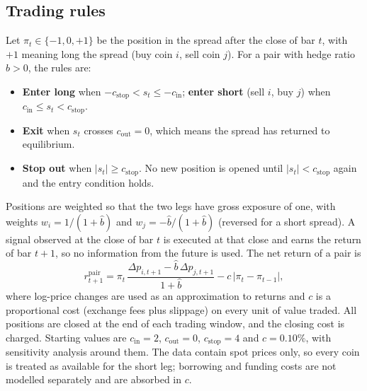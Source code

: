 \documentclass[10pt,a4paper,twocolumn]{article}
\begin{document}
	\subsection{Trading rules}
	\label{sec:rules}
	Let $\pi_t\in\{-1,0,+1\}$ be the position in the spread after the close of bar $t$, with $+1$ meaning long the spread (buy coin $i$, sell coin $j$). For a pair with hedge ratio $\hat b>0$, the rules are:
	\begin{itemize}
		\item \textbf{Enter long} when $-c_{\text{stop}}<s_t\le -c_{\text{in}}$; \textbf{enter short} (sell $i$, buy $j$) when $c_{\text{in}}\le s_t< c_{\text{stop}}$.
		\item \textbf{Exit} when $s_t$ crosses $c_{\text{out}}=0$, which means the spread has returned to equilibrium.
		\item \textbf{Stop out} when $|s_t|\ge c_{\text{stop}}$. No new position is opened until $|s_t|<c_{\text{stop}}$ again and the entry condition holds.
	\end{itemize}
	Positions are weighted so that the two legs have gross exposure of one, with weights $w_i=1/(1+\hat b)$ and $w_j=-\hat b/(1+\hat b)$ (reversed for a short spread). A signal observed at the close of bar $t$ is executed at that close and earns the return of bar $t+1$, so no information from the future is used. The net return of a pair is
	\begin{equation}
		r^{\text{pair}}_{t+1}=\pi_t\,\frac{\Delta p_{i,t+1}-\hat b\,\Delta p_{j,t+1}}{1+\hat b}-c\,\lvert\pi_t-\pi_{t-1}\rvert ,
		\label{eq:pairret}
	\end{equation}
	where log-price changes are used as an approximation to returns and $c$ is a proportional cost (exchange fees plus slippage) on every unit of value traded. All positions are closed at the end of each trading window, and the closing cost is charged. Starting values are $c_{\text{in}}=2$, $c_{\text{out}}=0$, $c_{\text{stop}}=4$ and $c=0.10\%$, with sensitivity analysis around them. The data contain spot prices only, so every coin is treated as available for the short leg; borrowing and funding costs are not modelled separately and are absorbed in $c$.
	
\end{document}

